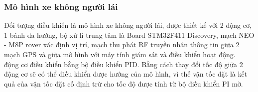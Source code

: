 \documentclass[a4paper, 12pt]{article}
\begin{document}
\newpage
\subsubsection{Mô hình xe không người lái}
\hspace{0.5cm}
Đối tượng điều khiển là mô hình xe không người lái, được thiết kế với 2 động cơ, 1 bánh đa hướng, bộ xử lí trung tâm là Board STM32F411 Discovery, mạch NEO - M8P rover xác định vị trí, mạch thu phát RF truyền nhân thông tin giữa 2 mạch GPS và giữa mô hình với máy tính giám sát và điều khiển hoạt động.\\ động cơ điều khiển bằng bộ điều khiển PID. Bằng cách thay đổi tốc độ giữa 2 động cơ sẽ có thể điều khiển được hướng của mô hình, vì thế vận tốc đặt là kết quả của vận tốc đặt cố định trừ cho tốc độ được tính từ bộ điều khiển PI mờ.\\
\end{document}
